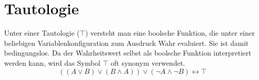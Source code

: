 \begin{comment}
\section{Logische und binäre Verknüpfungen}
%
In Zusammenhang mit dem Lernen von Programmiersprachen entsteht die Frage, was der Unterschied zwischen logischen und binären Evaluierungen von boolschen Ausdrücken ist. Wir betrachten die Programmiersprache C.
%
\lstset{language={C}, caption={Unterschied zwischen logischen und binären Operatoren.}, label={lst:difflogbin}}
\begin{lstlisting}
if (6 & 1) printf("foo");
if (6 && 1) printf("bar");
\end{lstlisting}
%
Dieses Teilprogramm gibt nur ,,bar`` zurück. Für die C-Programmiersprache sei auf den Artikel \href{http://cm.bell-labs.com/who/dmr/chist.html}{,,The Development of the C Language*``} von Dennis M. Ritchie\footnote{englischsprachiger Artikel. Unterkapitel ,,Neonatal C`` geht auf den Unterschied ein. Zuletzt abgerufen im November 2012} verwiesen. Die Frage nach dem Unterschied kann wie folgt beantwortet werden:

Bei einem Binäroperator wie etwa \& oder \textbar{} werden die beiden Operanden binär interpretiert. Dies bedeutet 6 (binär \binval{110}) und-verknüpft mit 1 (binär \binval{1}) ergibt \binval{000}.
\begin{center}
  \begin{tabular}{lccc}
       & 1 & 1 & 0 \\
       & 0 & 0 & 1 \\
  \hline
    \& & 0 & 0 & 0
  \end{tabular}
\end{center}

Bei einem logischen Operator (\&\&, \textbar\textbar) wird der Ausdruck zuerst in einen Binärwert verwandelt und später binär evaluiert. So evaluiert 6 (Wahrheitswert wahr, binär \binval{1}) und 1 (Wahrheitswert wahr, binär \binval{1}) zu wahr (binär \binval{1}). Ich möchte in Erinnerung rufen, dass in der Programmiersprache C Ausdrücke gleich Null (\texttt{NULL} und \texttt{0}) als falsch interpretiert werden. Alle anderen Ausdrücke sind wahr.
\end{comment}
%
\section{Tautologie}
%
Unter einer Tautologie ($\top$) versteht man eine boolsche Funktion, die unter einer beliebigen Variablenkonfiguration zum Ausdruck Wahr evaluiert. Sie ist damit bedingungslos. Da der Wahrheitswert selbst als boolsche Funktion interpretiert werden kann, wird das Symbol $\top$ oft synonym verwendet.
\begin{equation}
  ((A \lor B) \lor (B \land A)) \lor (\neg A \land \neg B) \leftrightarrow \top
\end{equation}
%
